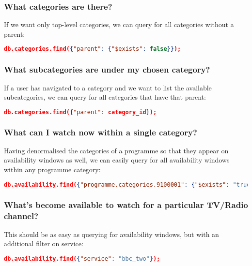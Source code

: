 \documentclass[11pt,a4paper]{article}
\begin{document}
\subsubsection{What categories are there?}

If we want only top-level categories, we can query for all categories
without a parent:

\begin{lstlisting}[language=json]
  db.categories.find({"parent": {"$exists": false}});
\end{lstlisting}

\subsubsection{What subcategories are under my chosen category?}

If a user has navigated to a category and we want to list the available
subcategories, we can query for all categories that have that parent:

\begin{lstlisting}[language=json]
  db.categories.find({"parent": category_id});
\end{lstlisting}

\subsubsection{What can I watch now within a single category?}

Having denormalised the categories of a programme so that they appear
on availability windows as well, we can easily query for all
availability windows within any programme category:

\begin{lstlisting}[language=json]
  db.availability.find({"programme.categories.9100001": {"$exists": "true"}});
\end{lstlisting}

\subsubsection{What's become available to watch for a particular TV/Radio channel?}

This should be as easy as querying for availability windows, but with an
additional filter on service:

\begin{lstlisting}[language=json]
  db.availability.find({"service": "bbc_two"});
\end{lstlisting}
\end{document}

